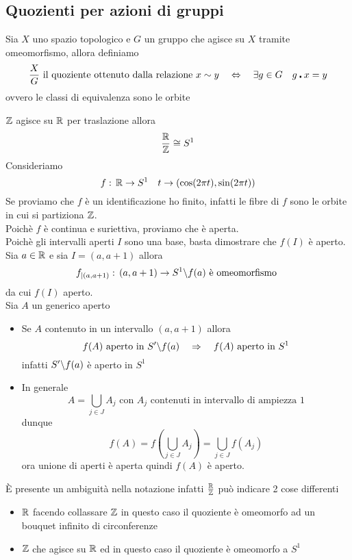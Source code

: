 \subsection{Quozienti per azioni di gruppi}
\begin{defn}Sia $X$ uno spazio topologico e $G$ un gruppo che agisce su $X$ tramite omeomorfismo, allora definiamo 
$$ \frac{X}{G} \text{ il quoziente ottenuto dalla relazione } x \sim y \quad \Leftrightarrow \quad \exists g \in G \quad g \centerdot x = y $$
ovvero le classi di equivalenza sono le orbite
\end{defn}
\begin{prop}$\mathbb{Z}$ agisce su $\mathbb{R}$ per traslazione allora
$$ \frac{\mathbb{R}}{\mathbb{Z}} \cong S^1$$
\proof Consideriamo
$$ f:\, \mathbb{R} \to S^1 \quad t \to (\cos (2\pi t) , \sin (2\pi t))$$
Se proviamo che $f$ \`e un identificazione ho finito, infatti le fibre di $f$ sono le orbite in cui si partiziona $\mathbb{Z}$.\\
Poich\`e $f$ \`e continua e suriettiva, proviamo che \`e aperta.\\
Poich\`e gli intervalli aperti $I$ sono una base, basta dimostrare che $f(I)$ \`e aperto.\\
Sia $a \in \mathbb{R}$ e sia $I=(a,a+1)$ allora
$$ f_{\vert (a,a+1)} : \, (a,a+1) \to S^1 \backslash f(a) \text{ \`e omeomorfismo }$$
da cui $f(I)$ aperto.\\
Sia $A$ un generico aperto
\begin{itemize}
\item Se $A$ contenuto in un intervallo $(a,a+1)$ allora
$$ f(A) \text{ aperto in } S' \backslash f(a) \quad\Rightarrow \quad f(A) \text{ aperto in } S^1$$
infatti $S'\backslash f(a)$ \`e aperto in $S^1$
\item In generale
$$A = \bigcup_{j\in J} A_j \text{ con } A_j \text{ contenuti in intervallo di ampiezza }1 $$
dunque 
$$ f(A) = f \left( \bigcup_{j \in J } A_j \right) = \bigcup_{j\in J} f(A_j)$$
ora unione di aperti \`e aperta quindi $f(A)$ \`e aperto.
\end{itemize}
\endproof
\end{prop}
\begin{oss}\`E presente un ambiguit\`a nella notazione infatti $\frac{\mathbb{R}}{\mathbb{Z}}$ pu\`o indicare 2 cose differenti
\begin{itemize}
\item $\mathbb{R}$ facendo collassare $\mathbb{Z}$ in questo caso il quoziente \`e omeomorfo ad un bouquet infinito di circonferenze
\item $\mathbb{Z}$ che agisce su $\mathbb{R}$ ed in questo caso il quoziente \`e omeomorfo a $S^1$
\end{itemize}
\end{oss}
